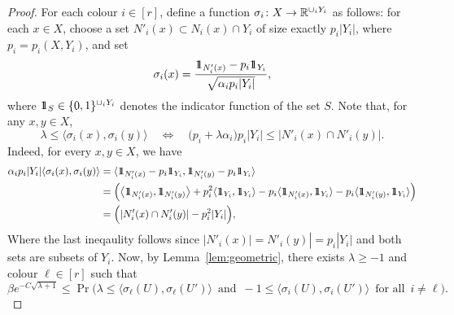 \begin{proof}

  For each colour $i \in [r]$, define a function $\sigma_i \colon X \rightarrow \mathbb{R}^{\cup_i Y_i}$ as follows: for each $x \in X$, choose a set $N'_i(x) \subset N_i(x) \cap Y_i$ of size exactly $p_i|Y_i|$, where $p_i = p_i(X,Y_i)$, and set
  $$\sigma_i(x) = \frac{\hbox{$1\mkern-6.5mu1$}_{N'_i(x)} - p_i\hbox{$1\mkern-6.5mu1$}_{Y_i}}{\sqrt{\alpha_ip_i|Y_i|}},$$
  where $\hbox{$1\mkern-6.5mu1$}_S \in \{0,1\}^{\cup_i Y_i}$ denotes the indicator function of the set $S$. Note that, for any $x,y\in X$,
  $$\lambda \le \big\langle \sigma_i(x),\sigma_i(y) \big\rangle \quad \Leftrightarrow \quad \big( p_i + \lambda\alpha_i \big) p_i |Y_i| \le |N'_i(x) \cap N'_i(y)|.$$
  Indeed, for every $x,y\in X$, we have 
  \begin{multline}
    \begin{aligned}
            \alpha_ip_i|Y_i| \langle \sigma_i(x),\sigma_i(y) \rangle &= \langle \id_{N'_i(x)}- p_i\id_{Y_i},\id_{N'_i(y)}- p_i\id_{Y_i}\rangle\\
            &= \Bigl(\big\langle \id_{N'_i(x)},\id_{N'_i(y)}\big\rangle +p_i^2\langle \id_{Y_i},
            \id_{Y_i}\rangle - p_i \langle \id_{N'_i(x)},\id_{Y_i}\rangle- p_i \langle \id_{N'_i(y)},\id_{Y_i}\rangle\Bigr)\\
            &= \Bigl(|N'_i(x) \cap N'_i(y)|-p_i^2|Y_i| \Bigr),
    \end{aligned}
  \end{multline}
  Where the last ineqaulity follows since $|N'_i(x)|= N'_i(y)|= p_i|Y_i|$ and both sets are subsets of $Y_i$.
  Now, by Lemma~\ref{lem:geometric}, there exists $\lambda \ge -1$ and colour $\ell \in [r]$ such that
  \begin{equation}
    \label{eq: geometric-app}
    \beta e^{- C\sqrt{\lambda + 1}} \le \Pr\Big( \lambda  \le \big\langle \sigma_\ell(U),\sigma_\ell(U') \big\rangle \, \text{ and } \, -1 \le \big\langle \sigma_i(U), \sigma_i(U') \big\rangle \, \text{ for all } \, i \ne \ell \Big) .
  \end{equation}


\end{proof}
